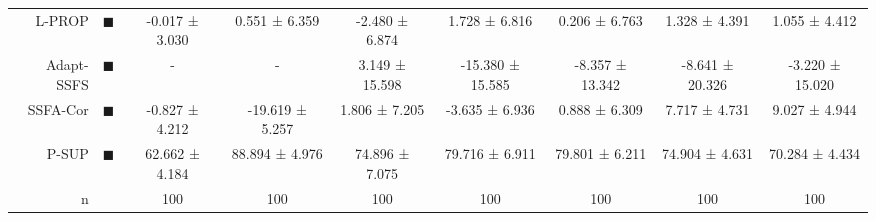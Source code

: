 \begin{tabular}{rcccccccc}
L-PROP     &                     \textcolor{LABEL_PROPAGATION}{\LARGE $\blacksquare$} &          -0.017 ± 3.030 &           0.551 ± 6.359 &           -2.480 ± 6.874 &           1.728 ± 6.816 &           0.206 ± 6.763 &            1.328 ± 4.391 &            1.055 ± 4.412 \\
Adapt-SSFS &                              \textcolor{ASSFSCMR}{\LARGE $\blacksquare$} &               - &               - &           3.149 ± 15.598 &        -15.380 ± 15.585 &         -8.357 ± 13.342 &          -8.641 ± 20.326 &          -3.220 ± 15.020 \\
SSFA-Cor   &                              \textcolor{SFAMCAMT}{\LARGE $\blacksquare$} &          -0.827 ± 4.212 &         -19.619 ± 5.257 &            1.806 ± 7.205 &          -3.635 ± 6.936 &           0.888 ± 6.309 &            7.717 ± 4.731 &            9.027 ± 4.944 \\
P-SUP      &         \textcolor{PARTIAL_SUPERVISED_CLASSIFIER}{\LARGE $\blacksquare$} &          62.662 ± 4.184 &          88.894 ± 4.976 &           74.896 ± 7.075 &          79.716 ± 6.911 &          79.801 ± 6.211 &           74.904 ± 4.631 &           70.284 ± 4.434 \\
n          &                                                                          &                     100 &                     100 &                      100 &                     100 &                     100 &                      100 &                      100 \\
\bottomrule
\end{tabular}
